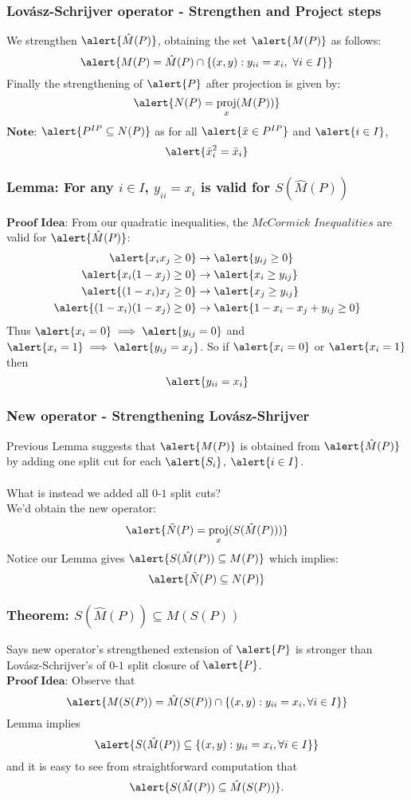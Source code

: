 \documentclass{beamer}
\DeclareMathOperator{\proj}{proj}
\begin{document}
\begin{frame}
\frametitle{Lov\'asz-Schrijver operator - Strengthen and Project steps}
We strengthen $\alert{\hat{M}(P)}$, obtaining the set $\alert{M(P)}$ as follows:
$$\alert{M(P) = \hat{M}(P) \cap \{ (x,y) : y_{ii} = x_{i},\ \forall i \in I\} } $$
Finally the strengthening of $\alert{P}$ after projection is given by:
$$\alert{N(P) = \proj_x(M(P))}$$
$\textbf{Note:}$ $\alert{P^{IP} \subseteq N(P)}$ as for all $\alert{\bar{x} \in P^{IP}}$ and $\alert{i \in I}$, 
$$\alert{\bar{x}_i^2 = \bar{x}_i}$$
\end{frame}

\begin{frame}
\frametitle{Lemma: For any $i\in I$, $y_{ii} = x_{i}$ is valid for $S(\hat{M}(P))$} 
$\textbf{Proof Idea:}$ From our quadratic inequalities, the $\textit{McCormick Inequalities}$ are valid for $\alert{\hat{M}(P)}$:
\begin{align*}
\alert{x_i x_j \geq 0} & \rightarrow \alert{y_{ij} \geq 0} \\
\alert{x_i(1-x_j)\geq 0} & \rightarrow \alert{x_i \geq y_{ij}} \\
\alert{(1-x_i)x_j \geq 0} & \rightarrow \alert{x_j \geq y_{ij}} \\
\alert{(1-x_i)(1-x_j) \geq 0} & \rightarrow \alert{1 - x_i - x_j + y_{ij}  \geq 0}
\end{align*}
Thus $\alert{x_i = 0} \implies \alert{y_{ij} = 0}$ and $\alert{x_i = 1} \implies \alert{y_{ij} = x_j}$. So if $\alert{x_i = 0}$ or $\alert{x_i = 1}$ then
$$\alert{y_{ii} = x_i}$$
\end{frame}

\begin{frame}
\frametitle{New operator - Strengthening Lov\'asz-Shrijver}
Previous Lemma suggests that $\alert{M(P)}$ is obtained from $\alert{\hat{M}(P)}$ by adding one split cut for each $\alert{S_i}$, $\alert{i \in I}$.\\\ \\
What is instead we added all $0$-$1$ split cuts?\\
We'd obtain the new operator:
$$\alert{\tilde{N}(P) = \proj_x(S(\hat{M}(P)))}$$
Notice our Lemma gives $\alert{S(\hat{M}(P)) \subseteq M(P)}$ which implies:
$$\alert{\tilde{N}(P) \subseteq N(P)}$$
\end{frame}

\begin{frame}
\frametitle{Theorem: $S(\hat{M}(P)) \subseteq M(S(P))$}
Says new operator's strengthened extension of $\alert{P}$ is stronger than Lov\'asz-Schrijver's of $0$-$1$ split closure of $\alert{P}$.
\\$\textbf{Proof Idea:}$ Observe that $$\alert{M(S(P)) = \hat{M}(S(P)) \cap \{(x,y):y_{ii} = x_i, \forall i \in I\}}$$
Lemma implies $$\alert{S(\hat{M}(P)) \subseteq \{(x,y):y_{ii}=x_i, \forall i \in I \}}$$  and it is easy to see from straightforward computation that $$\alert{S(\hat{M}(P)) \subseteq \hat{M}(S(P))}.$$ 
\end{frame}
\end{document}
